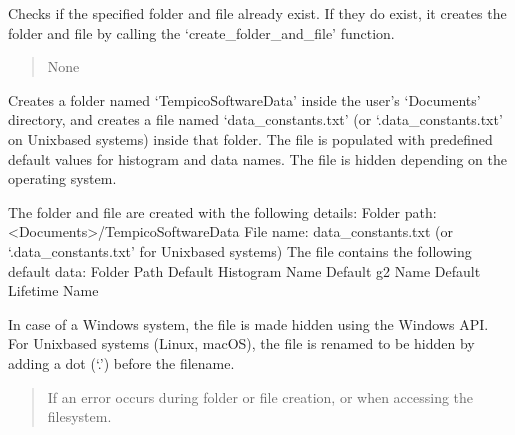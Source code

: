 \documentclass[letterpaper,10pt,english]{sphinxmanual}
\begin{document}
\begin{fulllineitems}

\begin{fulllineitems}
\label{\detokenize{createsavefile:createsavefile.createsavefile.create_folder}}
\pysigstartsignatures
{}
\pysigstopsignatures
\sphinxAtStartPar
Checks if the specified folder and file already exist. If they do exist, it creates 
the folder and file by calling the ‘create\_folder\_and\_file’ function.
\begin{quote}\begin{description}
\sphinxAtStartPar
None

\end{description}\end{quote}

\end{fulllineitems}


\begin{fulllineitems}
\label{\detokenize{createsavefile:createsavefile.createsavefile.create_folder_and_file}}
\pysigstartsignatures
{}
\pysigstopsignatures
\sphinxAtStartPar
Creates a folder named ‘TempicoSoftwareData’ inside the user’s ‘Documents’ directory, 
and creates a file named ‘data\_constants.txt’ (or ‘.data\_constants.txt’ on Unix\sphinxhyphen{}based systems) inside that folder. 
The file is populated with predefined default values for histogram and data names. 
The file is hidden depending on the operating system.

\sphinxAtStartPar
The folder and file are created with the following details:
\sphinxhyphen{} Folder path: \textless{}Documents\textgreater{}/TempicoSoftwareData
\sphinxhyphen{} File name: data\_constants.txt (or ‘.data\_constants.txt’ for Unix\sphinxhyphen{}based systems)
\sphinxhyphen{} The file contains the following default data:
\sphinxhyphen{} Folder Path
\sphinxhyphen{} Default Histogram Name
\sphinxhyphen{} Default g2 Name
\sphinxhyphen{} Default Lifetime Name

\sphinxAtStartPar
In case of a Windows system, the file is made hidden using the Windows API. For Unix\sphinxhyphen{}based systems (Linux, macOS), 
the file is renamed to be hidden by adding a dot (‘.’) before the filename.
\begin{quote}\begin{description}
\sphinxAtStartPar
{} \textendash{} If an error occurs during folder or file creation, or when accessing the filesystem.


\end{description}
\end{quote}
\end{fulllineitems}
\end{fulllineitems}
\end{document}
